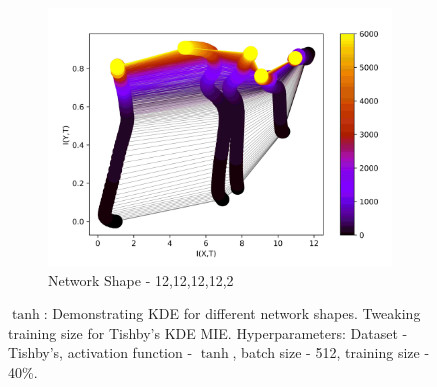 \documentclass[dissertation.tex]{subfiles}
\begin{document}
\begin{figure}[ht]
\begin{subfigure}[t]{0.32\textwidth}
    \centering
    \includegraphics[width=\textwidth]{figs/eval/networkShape/KDE12,12,12.jpg}
    \caption{
      Network Shape - 12,12,12,12,2
    }
  \end{subfigure}
  \hfill
  \caption{
      $\tanh$: Demonstrating KDE for different network shapes.  Tweaking training
      size for Tishby's KDE MIE. Hyperparameters: Dataset - Tishby's, activation
      function - $\tanh$, batch size - 512, training size - 40\%.
    }
  \label{figNetworkShapesAA}
\end{figure}
\end{document}
